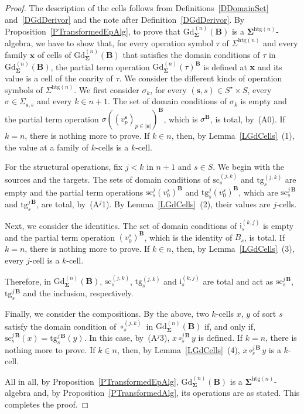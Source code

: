 \documentclass[a4paper, reqno]{amsbook}
\newcommand{\bb}[1]{\ensuremath{\lvert #1 \rvert}}
\newcommand{\sig}[1]{\mathbf{#1}}             %
\newcommand{\htg}{\mathrm{htg}}                %
\newcommand{\src}{\mathrm{sc}}
\newcommand{\tgt}{\mathrm{tg}}
\newcommand{\Gd}{\mathrm{Gd}}
\theoremstyle{plain}
\theoremstyle{definition}
\begin{document}
\begin{proof}
The description of the cells follows from Definitions~\ref{DDomainSet} and~\ref{DGdDerivor} and the note after Definition~\ref{DGdDerivor}.
By Proposition~\ref{PTransformedEpAlg}, to prove that $\Gd^{(n)}_{\sig{\Sigma}}(\mathbf{B})$ is a $\sig{\Sigma}^{\htg(n)}$-algebra, we have to show that, for every operation symbol $\tau$ of $\Sigma^{\htg(n)}$ and every family $\mathbf{x}$ of cells of $\Gd^{(n)}_{\sig{\Sigma}}(\mathbf{B})$ that satisfies the domain conditions of $\tau$ in $\Gd^{(n)}_{\sig{\Sigma}}(\mathbf{B})$, the partial term operation $\Gd^{(n)}_{\sig{\Sigma}}(\tau)^{\mathbf{B}}$ is defined at $\mathbf{x}$ and its value is a cell of the coarity of $\tau$.
We consider the different kinds of operation symbols of $\Sigma^{\htg(n)}$.
We first consider $\sigma_k$, for every $(\mathbf{s},s)\in S^{\star}\times S$, every $\sigma\in\Sigma_{\mathbf{s},s}$ and every $k\in n+1$.
The set of domain conditions of $\sigma_{k}$ is empty and the partial term operation $\sigma((v^{\mathbf{s}}_{p})_{p\in\bb{\mathbf{s}}})^{\mathbf{B}}$, which is $\sigma^{\mathbf{B}}$, is total, by~(A0).
If $k=n$, there is nothing more to prove.
If $k\in n$, then, by Lemma~\ref{LGdCells}~(1), the value at a family of $k$-cells is a $k$-cell.

For the structural operations, fix $j<k$ in $n+1$ and $s\in S$.
We begin with the sources and the targets.
The sets of domain conditions of $\src^{(j,k)}_{s}$ and $\tgt^{(j,k)}_{s}$ are empty and the partial term operations $\src^{j}_{s}(v^{s}_{0})^{\mathbf{B}}$ and $\tgt^{j}_{s}(v^{s}_{0})^{\mathbf{B}}$, which are $\src^{j\,\mathbf{B}}_{s}$ and $\tgt^{j\,\mathbf{B}}_{s}$, are total, by~(A$^{j}$1).
By Lemma~\ref{LGdCells}~(2), their values are $j$-cells.

Next, we consider the identities.
The set of domain conditions of $\mathrm{i}^{(k,j)}_{s}$ is empty and the partial term operation $(v^{s}_{0})^{\mathbf{B}}$, which is the identity of $B_{s}$, is total.
If $k=n$, there is nothing more to prove.
If $k\in n$, then, by Lemma~\ref{LGdCells}~(3), every $j$-cell is a $k$-cell.

Therefore, in $\Gd^{(n)}_{\sig{\Sigma}}(\mathbf{B})$, $\src^{(j,k)}_{s}$, $\tgt^{(j,k)}_{s}$ and $\mathrm{i}^{(k,j)}_{s}$ are total and act as $\src^{j\,\mathbf{B}}_{s}$, $\tgt^{j\,\mathbf{B}}_{s}$ and the inclusion, respectively.

Finally, we consider the compositions.
By the above, two $k$-cells $x$, $y$ of sort $s$ satisfy the domain condition of $\circ^{(j,k)}_{s}$ in $\Gd^{(n)}_{\sig{\Sigma}}(\mathbf{B})$ if, and only if, $\src^{j\,\mathbf{B}}_{s}(x)=\tgt^{j\,\mathbf{B}}_{s}(y)$.
In this case, by~(A$^{j}$3), $x\circ^{j\,\mathbf{B}}_{s}y$ is defined.
If $k=n$, there is nothing more to prove.
If $k\in n$, then, by Lemma~\ref{LGdCells}~(4), $x\circ^{j\,\mathbf{B}}_{s}y$ is a $k$-cell.

All in all, by Proposition~\ref{PTransformedEpAlg}, $\Gd^{(n)}_{\sig{\Sigma}}(\mathbf{B})$ is a $\sig{\Sigma}^{\htg(n)}$-algebra and, by Proposition~\ref{PTransformedAlg}, its operations are as stated. This completes the proof.
\end{proof}
\end{document}
